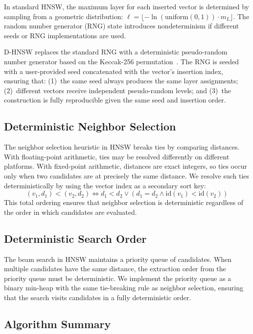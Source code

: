 \documentclass[10pt,journal]{IEEEtran}
\newcommand{\dhnsw}{\textsc{D-HNSW}}
\newcommand{\hnsw}{\textsc{HNSW}}
\begin{document}
In standard \hnsw{}, the maximum layer for each inserted vector is determined by sampling from a geometric distribution: $\ell = \lfloor -\ln(\text{uniform}(0,1)) \cdot m_L \rfloor$. The random number generator (RNG) state introduces nondeterminism if different seeds or RNG implementations are used.

\dhnsw{} replaces the standard RNG with a deterministic pseudo-random number generator based on the Keccak-256 permutation~\cite{bertoni2013keccak}. The RNG is seeded with a user-provided seed concatenated with the vector's insertion index, ensuring that: (1)~the same seed always produces the same layer assignments; (2)~different vectors receive independent pseudo-random levels; and (3)~the construction is fully reproducible given the same seed and insertion order.

\subsection{Deterministic Neighbor Selection}

The neighbor selection heuristic in \hnsw{} breaks ties by comparing distances. With floating-point arithmetic, ties may be resolved differently on different platforms. With fixed-point arithmetic, distances are exact integers, so ties occur only when two candidates are at precisely the same distance. We resolve such ties deterministically by using the vector index as a secondary sort key:
\begin{equation}
  (v_1, d_1) < (v_2, d_2) \iff d_1 < d_2 \lor (d_1 = d_2 \land \text{id}(v_1) < \text{id}(v_2))
\end{equation}
This total ordering ensures that neighbor selection is deterministic regardless of the order in which candidates are evaluated.

\subsection{Deterministic Search Order}

The beam search in \hnsw{} maintains a priority queue of candidates. When multiple candidates have the same distance, the extraction order from the priority queue must be deterministic. We implement the priority queue as a binary min-heap with the same tie-breaking rule as neighbor selection, ensuring that the search visits candidates in a fully deterministic order.

\subsection{Algorithm Summary}
\end{document}
